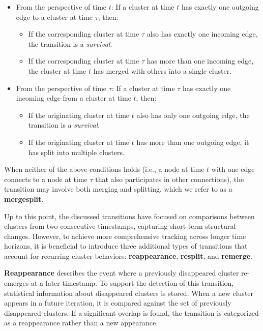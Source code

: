 \begin{itemize}
    \item From the perspective of time $ t $: If a cluster at time $ t $ has exactly one
          outgoing edge to a cluster at time $ \tau $, then:
          \begin{itemize}
              \item If the corresponding cluster at time $ \tau $ also has exactly one incoming
                    edge, the transition is a \emph{survival}.
              \item If the corresponding cluster at time $ \tau $ has more than one incoming edge,
                    the cluster at time $ t $ has merged with others into a single cluster.
          \end{itemize}

    \item From the perspective of time $ \tau $: If a cluster at time $ \tau $ has
          exactly one incoming edge from a cluster at time $ t $, then:
          \begin{itemize}
              \item If the originating cluster at time $ t $ also has only one outgoing edge, the
                    transition is a \emph{survival}.
              \item If the originating cluster at time $ t $ has more than one outgoing edge, it
                    has split into multiple clusters.
          \end{itemize}
\end{itemize}

When neither of the above conditions holds (i.e., a node at time $ t $ with one
edge connects to a node at time $ \tau $ that also participates in other
connections), the transition may involve both merging and splitting, which we
refer to as a \textbf{mergesplit}.



Up to this point, the discussed transitions have focused on comparisons between
clusters from two consecutive timestamps, capturing short-term structural
changes. However, to achieve more comprehensive tracking across longer time
horizons, it is beneficial to introduce three additional types of transitions
that account for recurring cluster behaviors: \textbf{reappearance},
\textbf{resplit}, and \textbf{remerge}.

\textbf{Reappearance} describes the event where a previously disappeared cluster
re-emerges at a later timestamp. To support the detection of this transition,
statistical information about disappeared clusters is stored. When a new cluster
appears in a future iteration, it is compared against the set of previously
disappeared clusters. If a significant overlap is found, the transition is
categorized as a reappearance rather than a new appearance.


